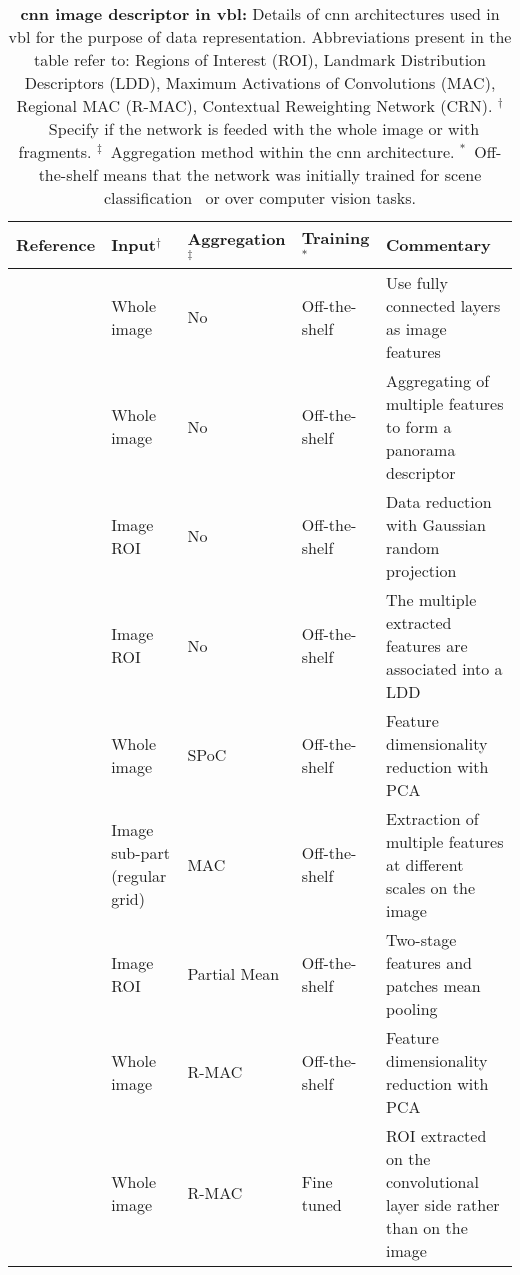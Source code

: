 \begin{landscape}
\begin{table}[!ht]
	\centering
	\caption[\Ac{cnn} image descriptor in \ac{vbl}]{\label{tab:cnn_details} \textbf{\ac{cnn} image descriptor in \ac{vbl}:} Details of \ac{cnn} architectures used in \ac{vbl} for the purpose of data representation. Abbreviations present in the table refer to: Regions of Interest (ROI), Landmark Distribution Descriptors (LDD), Maximum Activations of Convolutions (MAC), Regional MAC (R-MAC), Contextual Reweighting Network (CRN). $^\dagger$~Specify if the network is feeded with the whole image or with fragments. $^\ddagger$~Aggregation method within the \ac{cnn} architecture. $^*$~Off-the-shelf means that the network was initially trained for scene classification~\citep{Krizhevsky2012} or over computer vision tasks.}
	\renewcommand{\arraystretch}{1.1}
	\small{
		\begin{tabular}{p{} p{} l l p{}}
			\hline
			\textbf{Reference} 			& \textbf{Input}$^\dagger$ 	& \textbf{Aggregation}$^\ddagger$ 		& \textbf{Training}$^*$ & \textbf{Commentary}\\
			\hline
			\hline
			\citep{Babenko2014,Sunderhauf2015,Yan2016} & Whole image & No & Off-the-shelf & Use fully connected layers as image features\\
			\citep{Kumar2016mastersThesis} & Whole image & No & Off-the-shelf & Aggregating of multiple features to form a panorama descriptor\\
			\hline
			\citep{Sunderhauf2015a,Yan2016} & Image ROI & No & Off-the-shelf & Data reduction with Gaussian random projection \\
			\citep{Panphattarasap2016} & Image ROI & No & Off-the-shelf & The multiple extracted features are associated into a LDD \\			
			\hline
			\citep{Babenko2015} & Whole image & SPoC & Off-the-shelf & Feature dimensionality reduction with PCA \\
			\hline
			\citep{Razavian2014a} & Image sub-part (regular grid) & MAC & Off-the-shelf & Extraction of multiple features at different scales on the image\\
			\hline					
			\citep{Zhi2016} & Image ROI & Partial Mean & Off-the-shelf & Two-stage features and patches mean pooling \\
			\hline
			\citep{Tolias2016} & Whole image & R-MAC & Off-the-shelf & Feature dimensionality reduction with PCA  \\							
			\citep{Gordo2016} & Whole image & R-MAC & Fine tuned & ROI extracted on the convolutional layer side rather than on the image \\

\end{tabular}}
\end{table}
\end{landscape}
